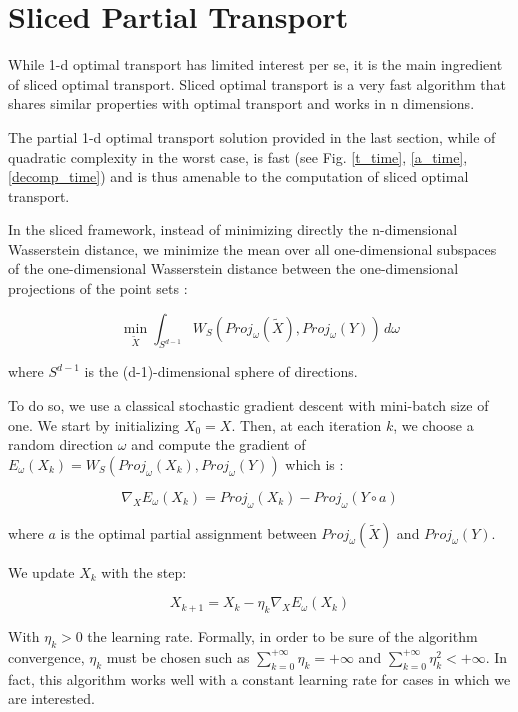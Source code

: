 \documentclass[a4paper,12pt]{article}
\begin{document}
\section{Sliced Partial Transport}

While 1-d optimal transport has limited interest per se, it is the main ingredient of sliced optimal transport. Sliced optimal transport is a very fast algorithm that shares similar properties with optimal transport and works in n dimensions.

The partial 1-d optimal transport solution provided in the last section, while of quadratic complexity in the worst case, is fast (see Fig. \ref{t_time}, \ref{a_time}, \ref{decomp_time}) and is thus amenable to the computation of sliced optimal transport.

In the sliced framework, instead of minimizing directly the n-dimensional Wasserstein distance, we minimize the mean over all one-dimensional subspaces of the one-dimensional Wasserstein distance between the one-dimensional projections of the point sets :

\begin{equation}
\min_{\tilde{X}} \int_{S^{d-1}} W_S(Proj_\omega(\tilde{X}),Proj_\omega(Y))\,d\omega
\end{equation}

\noindent where $S^{d−1}$ is the (d-1)-dimensional sphere of directions.

To do so, we use a classical stochastic gradient descent with mini-batch size of one. We start by initializing $X_0 = X$. Then, at each iteration $k$, we choose a random direction $\omega$ and compute the gradient of $E_\omega(X_k) = W_S(Proj_\omega(X_k),Proj_\omega(Y))$ which is :

\begin{equation}
\nabla_{X}  E_\omega(X_k) = Proj_\omega(X_k)-Proj_\omega(Y \circ a)
\end{equation}

\noindent where $a$ is the optimal partial assignment between $Proj_\omega(\tilde{X})$ and $Proj_\omega(Y)$. 

We update $X_k$ with the step:

$$
X_{k+1} = X_k - \eta_k \nabla_{X}  E_\omega(X_k)
$$

\noindent With $\eta_k>0$ the learning rate. Formally, in order to be sure of the algorithm convergence, $\eta_k$ must be chosen such as $\sum_{k=0}^{+\infty} \eta_k = +\infty$ and $\sum_{k=0}^{+\infty} \eta_k^2 < +\infty$. In fact, this algorithm works well with a constant learning rate for cases in which we are interested.
\end{document}
